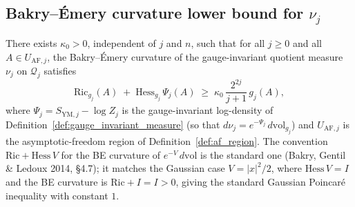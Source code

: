 \subsection{Bakry--\'Emery curvature lower bound for $\nu_{j}$}
\label{ssec:app229_be_curvature}

\begin{theorem}
\label{thm:be_curvature_gauge_invariant}
There exists $\kappa_{0}>0$, independent of $j$ and $n$, such
that for all $j\ge 0$ and all $A\in U_{\mathrm{AF},j}$, the
Bakry--\'Emery curvature of the gauge-invariant quotient
measure $\nu_{j}$ on $\mathcal{Q}_{j}$ satisfies
\begin{equation}
\label{eq:be_curvature_gauge_invariant}
  \mathrm{Ric}_{g_{j}}(A)\;+\;\mathrm{Hess}_{g_{j}}\,
  \Psi_{j}(A)
  \;\ge\;\kappa_{0}\,\frac{2^{2j}}{j+1}\,g_{j}(A),
\end{equation}
where $\Psi_{j}=S_{\mathrm{YM},j}-\log Z_{j}$ is the
gauge-invariant log-density of
Definition~\ref{def:gauge_invariant_measure} (so that
$d\nu_{j}=e^{-\Psi_{j}}\,d\mathrm{vol}_{g_{j}}$) and
$U_{\mathrm{AF},j}$ is the asymptotic-freedom region of
Definition~\ref{def:af_region}. The convention
$\mathrm{Ric}+\mathrm{Hess}\,V$ for the BE curvature of
$e^{-V}\,d\mathrm{vol}$ is the standard one (Bakry, Gentil \&
Ledoux 2014, \S 4.7); it matches the Gaussian case
$V=|x|^{2}/2$, where $\mathrm{Hess}\,V=I$ and the BE curvature
is $\mathrm{Ric}+I=I>0$, giving the standard Gaussian
Poincar\'e inequality with constant $1$.
\end{theorem}

